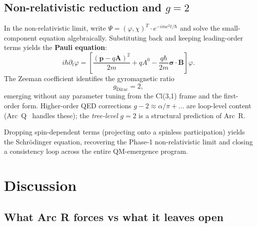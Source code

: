 \documentclass[11pt,a4paper]{article}
\begin{document}
\subsection{Non-relativistic reduction and $g = 2$}

In the non-relativistic limit, write $\Psi = (\varphi, \chi)^T \cdot e^{-imc^2 t/\hbar}$ and solve the small-component equation algebraically. Substituting back and keeping leading-order terms yields the \textbf{Pauli equation}:
\begin{equation}
i\hbar \partial_t \varphi = \left[ \frac{(\mathbf{p} - q\mathbf{A})^2}{2m} + qA^0 - \frac{q\hbar}{2m} \boldsymbol{\sigma} \cdot \mathbf{B} \right] \varphi.
\end{equation}
The Zeeman coefficient identifies the gyromagnetic ratio
\begin{equation}
\boxed{g_{\mathrm{Dirac}} = 2,}
\end{equation}
emerging without any parameter tuning from the Cl(3,1) frame and the first-order form. Higher-order QED corrections $g - 2 \approx \alpha/\pi + \dots$ are loop-level content (Arc~Q~\cite{arcq} handles these); the \emph{tree-level} $g = 2$ is a structural prediction of Arc~R.

Dropping spin-dependent terms (projecting onto a spinless participation) yields the Schr\"odinger equation, recovering the Phase-1 non-relativistic limit and closing a consistency loop across the entire QM-emergence program.

\section{Discussion}
\label{sec:discussion}

\subsection{What Arc R forces vs what it leaves open}
\end{document}
